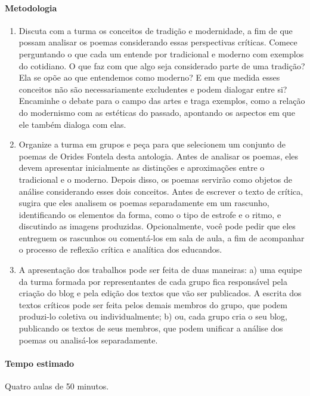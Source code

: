 \documentclass[12pt]{extarticle}
\begin{document}
\paragraph{Metodologia}
\begin{enumerate}
\item Discuta com a turma os conceitos de tradição e
modernidade, a fim de que possam analisar os poemas considerando essas
perspectivas críticas. Comece perguntando o que cada um entende por
tradicional e moderno com exemplos do cotidiano. O que faz com que algo
seja considerado parte de uma tradição? Ela se opõe ao que entendemos
como moderno? E em que medida esses conceitos não são necessariamente
excludentes e podem dialogar entre si? Encaminhe o debate para o campo
das artes e traga exemplos, como a relação do modernismo com as
estéticas do passado, apontando os aspectos em que ele também dialoga
com elas.

\item Organize a turma em grupos e peça para que selecionem um conjunto de
poemas de Orides Fontela desta antologia. Antes de analisar os poemas,
eles devem apresentar inicialmente as distinções e aproximações entre o
tradicional e o moderno. Depois disso, os poemas servirão como objetos
de análise considerando esses dois conceitos. Antes de escrever o texto
de crítica, sugira que eles analisem os poemas separadamente em um
rascunho, identificando os elementos da forma, como o tipo de estrofe e
o ritmo, e discutindo as imagens produzidas. Opcionalmente, você pode
pedir que eles entreguem os rascunhos ou comentá-los em sala de aula, a
fim de acompanhar o processo de reflexão crítica e analítica dos
educandos.

\item A apresentação dos trabalhos pode ser feita de duas maneiras: a) uma
equipe da turma formada por representantes de cada grupo fica
responsável pela criação do blog e pela edição dos textos que vão ser
publicados. A escrita dos textos críticos pode ser feita pelos demais
membros do grupo, que podem produzi-lo coletiva ou individualmente; b)
ou, cada grupo cria o seu blog, publicando os textos de seus membros,
que podem unificar a análise dos poemas ou analisá-los separadamente.
\end{enumerate}

\paragraph{Tempo estimado} Quatro aulas de 50 minutos.
\end{document}
